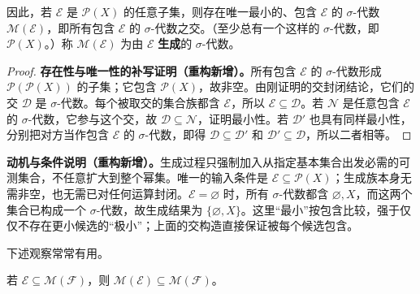\documentclass[../../main.tex]{subfiles}%
\begin{document}
\begin{definition}\label{definition:ch01-generated-sigma-algebra}
因此，若 $\mathscr{E}$ 是 $\mathscr{P}(X)$ 的任意子集，则存在唯一最小的、包含 $\mathscr{E}$ 的 $\sigma$-代数 $\mathscr{M}(\mathscr{E})$，即所有包含 $\mathscr{E}$ 的 $\sigma$-代数之交。（至少总有一个这样的 $\sigma$-代数，即 $\mathscr{P}(X)$。）称 $\mathscr{M}(\mathscr{E})$ 为由 $\mathscr{E}$ \textbf{生成}的 $\sigma$-代数。
\end{definition}
\begin{proof}
\textbf{存在性与唯一性的补写证明（重构新增）。}所有包含 $\mathscr{E}$ 的 $\sigma$-代数形成 $\mathscr{P}(\mathscr{P}(X))$ 的子集；它包含 $\mathscr{P}(X)$，故非空。由刚证明的交封闭结论，它们的交 $\mathscr{D}$ 是 $\sigma$-代数。每个被取交的集合族都含 $\mathscr{E}$，所以 $\mathscr{E}\subseteq\mathscr{D}$。若 $\mathscr{N}$ 是任意包含 $\mathscr{E}$ 的 $\sigma$-代数，它参与这个交，故 $\mathscr{D}\subseteq\mathscr{N}$，证明最小性。若 $\mathscr{D}'$ 也具有同样最小性，分别把对方当作包含 $\mathscr{E}$ 的 $\sigma$-代数，即得 $\mathscr{D}\subseteq\mathscr{D}'$ 和 $\mathscr{D}'\subseteq\mathscr{D}$，所以二者相等。
\end{proof}
\begin{remark}
\textbf{动机与条件说明（重构新增）。}生成过程只强制加入从指定基本集合出发必需的可测集合，不任意扩大到整个幂集。唯一的输入条件是 $\mathscr{E}\subseteq\mathscr{P}(X)$；生成族本身无需非空，也无需已对任何运算封闭。$\mathscr{E}=\varnothing$ 时，所有 $\sigma$-代数都含 $\varnothing,X$，而这两个集合已构成一个 $\sigma$-代数，故生成结果为 $\{\varnothing,X\}$。这里“最小”按包含比较，强于仅仅不存在更小候选的“极小”；上面的交构造直接保证被每个候选包含。
\end{remark}

下述观察常常有用。

\begin{lemma}\label{lemma:ch01-generated-inclusion}
若 $\mathscr{E}\subseteq\mathscr{M}(\mathscr{F})$，则 $\mathscr{M}(\mathscr{E})\subseteq\mathscr{M}(\mathscr{F})$。
\end{lemma}
\end{document}
